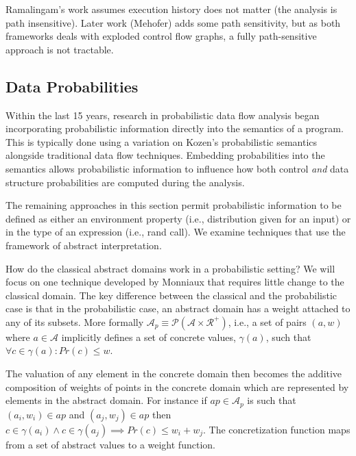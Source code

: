 
Ramalingam's work assumes execution history does not matter 
(the analysis is path insensitive).
Later work (Mehofer) adds some path sensitivity, but as both
frameworks deals with exploded control flow graphs, a fully 
path-sensitive approach is not tractable.

\subsection{Data Probabilities}

Within the last 15 years, research in probabilistic data flow analysis
began incorporating probabilistic information directly into
the semantics of a program.
This is typically done using a variation on Kozen's 
probabilistic semantics alongside traditional data
flow techniques.
Embedding probabilities into the semantics allows probabilistic
information to influence how both control {\sl and} data structure
probabilities are computed during the analysis.

The remaining approaches in this section permit probabilistic
information to be defined as either an environment property
(i.e., distribution given for an input) or in the type of
an expression (i.e., rand call).
We examine techniques that use the framework of abstract
interpretation.

How do the classical abstract domains work in a
probabilistic setting?
We will focus on one technique developed by Monniaux
that requires little change to the classical domain.
The key difference between the classical and the probabilistic 
case is that in the probabilistic case, 
an abstract domain has a weight attached to any of its subsets.
More formally
$\mathcal{A}_p \equiv \mathcal{P}(\mathcal{A} \times \mathcal{R}^+)$, 
i.e., a set of pairs $(a,w)$ where $a \in \mathcal{A}$ implicitly
defines a set of concrete values, $\gamma(a)$, such that
$\forall c \in \gamma(a) : Pr(c) \le w$.

The valuation of any element in the concrete domain then 
becomes the additive composition of weights of points in 
the concrete domain which are represented by elements in
the abstract domain.
For instance if $ap \in \mathcal{A}_p$ is such that
$(a_i,w_i) \in ap$ and 
$(a_j,w_j) \in ap$ then $c \in \gamma(a_i) \wedge
c \in \gamma(a_j) \implies Pr(c) \le w_i + w_j$.
The concretization function maps from a set of abstract
values to a weight function.

